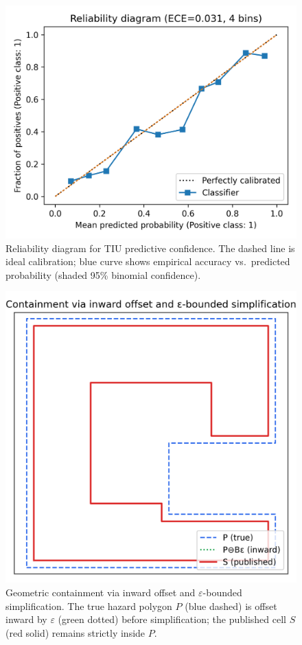 \documentclass[journal]{new-aiaa}
\begin{document}
\begin{figure}[t]
  \centering
  \includegraphics[width=0.85\linewidth]{reliability_plot.png}
  \caption{Reliability diagram for TIU predictive confidence. The dashed line is ideal calibration; blue curve shows empirical accuracy vs.\ predicted probability (shaded 95\% binomial confidence).}
  \label{fig:reliability}
\end{figure}

\begin{figure}[t]
  \centering
  \includegraphics[width=0.85\linewidth]{containment_demo.png}
  \caption{Geometric containment via inward offset and $\varepsilon$-bounded simplification. The true hazard polygon $P$ (blue dashed) is offset inward by $\varepsilon$ (green dotted) before simplification; the published cell $S$ (red solid) remains strictly inside $P$.}
  \label{fig:containment}
\end{figure}
\end{document}
